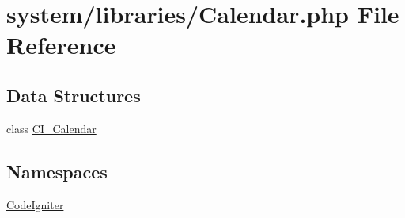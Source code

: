 \hypertarget{_calendar_8php}{}\section{system/libraries/\+Calendar.php File Reference}
\label{_calendar_8php}
\subsection*{Data Structures}
\begin{DoxyCompactItemize}
\item 
class \mbox{\hyperlink{class_c_i___calendar}{C\+I\+\_\+\+Calendar}}
\end{DoxyCompactItemize}
\subsection*{Namespaces}
\begin{DoxyCompactItemize}
\item 
 \mbox{\hyperlink{namespace_code_igniter}{Code\+Igniter}}
\end{DoxyCompactItemize}
